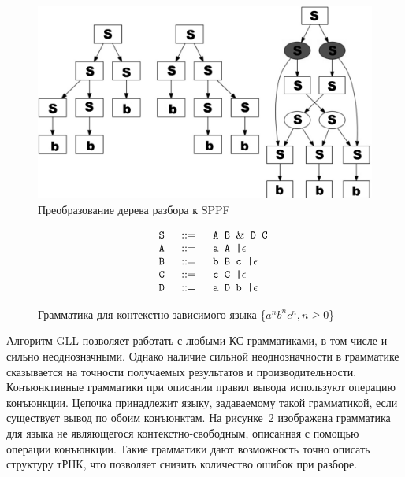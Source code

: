 \begin{figure}
\centering
\includegraphics[width=\textwidth]{Gorokhov/courseworkpictures/SPPF.PNG}
\caption{Преобразование дерева разбора к SPPF}
\label{SPPF}
\end{figure}

\begin{figure}
$$
\begin{array}{crcl}
& \mbox{\texttt{ S }} &::=& \mbox{\texttt{ A B }} \& \mbox{\texttt{ D C}} \\
& \mbox{\texttt{ A }} & ::=& \mbox{\texttt{ a A |}}  \epsilon \\
& \mbox{\texttt{ B }} & ::=& \mbox{\texttt{ b B c |}}  \epsilon \\
& \mbox{\texttt{ C }} & ::=& \mbox{\texttt{ c C |}}  \epsilon \\
& \mbox{\texttt{ D }} & ::=& \mbox{\texttt{ a D b |}}\epsilon \\
\end{array}
$$
\caption{Грамматика для контекстно-зависимого языка \{$a^n b^n c^n, n \geq 0$\}}
\label{gabc}
\end{figure}

Алгоритм GLL позволяет работать с любыми КС-грамматиками, в том числе и сильно неоднозначными. Однако наличие сильной неоднозначности в грамматике сказывается на точности получаемых результатов и производительности. 
  Конъюнктивные грамматики при описании правил вывода используют операцию конъюнкции. Цепочка принадлежит языку, задаваемому такой грамматикой, если существует вывод по обоим конъюнктам. На рисунке~\ref{gabc} изображена грамматика для языка не являющегося контекстно-свободным, описанная с помощью операции конъюнкции. Такие грамматики дают возможность точно описать структуру тРНК, что позволяет снизить количество ошибок при разборе.

